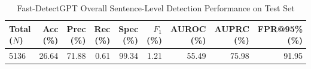 \begin{table}[htbp]
\centering
\caption{Fast-DetectGPT Overall Sentence-Level Detection Performance on Test Set}
\label{tab:fdgpt_overall_results}
\begin{tabular}{lrrrrrrrr}
\toprule
\textbf{Total ($N$)} & \textbf{Acc (\%)} & \textbf{Prec (\%)} & \textbf{Rec (\%)} & \textbf{Spec (\%)} & \textbf{$F_1$ (\%)} & \textbf{AUROC (\%)} & \textbf{AUPRC (\%)} & \textbf{FPR@95\% (\%)} \\
\midrule
5136 & 26.64 & 71.88 & 0.61 & 99.34 & 1.21 & 55.49 & 75.98 & 91.95 \\
\bottomrule
\end{tabular}
\end{table}